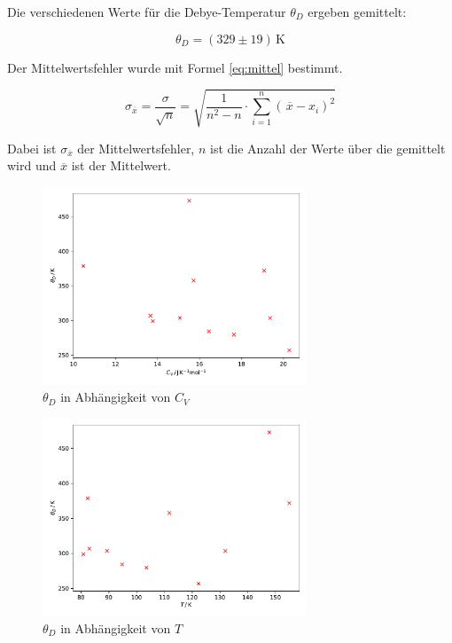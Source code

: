 Die verschiedenen Werte für die Debye-Temperatur $\theta_D$ ergeben gemittelt:

\begin{equation*}
    \theta_D = (329 \pm 19) \, \mathrm{K}
    \label{eq:debye}
\end{equation*}

Der Mittelwertsfehler wurde mit Formel \eqref{eq:mittel} bestimmt.

\begin{equation}
    \sigma_{\overline{x}} = \frac{\sigma}{\sqrt{n}} = \sqrt{\frac{1}{n^2 - n} \cdot \sum\limits_{i=1}^{n} \left( \, \overline{x} - x_i \right)^2}
    \label{eq:mittel}
\end{equation}

Dabei ist $\sigma_{\overline{x}}$ der Mittelwertsfehler, $n$ ist die Anzahl der Werte über die gemittelt wird und $\overline{x}$ ist der Mittelwert.

\begin{figure}[H]
    \centering
    \includegraphics[width=0.7\textwidth]{build/Theta_C_V.pdf}
    \caption{$\theta_D$ in Abhängigkeit von $C_V$}
    \label{fig:Theta_C_V}
\end{figure}

\begin{figure}[H]
    \centering
    \includegraphics[width=0.7\textwidth]{build/Theta_T.pdf}
    \caption{$\theta_D$ in Abhängigkeit von $T$}
    \label{fig:Theta_T}
\end{figure}

